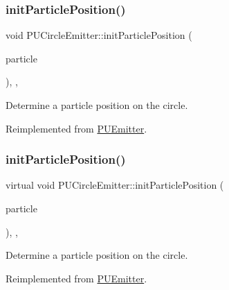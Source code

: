 \subsubsection{\texorpdfstring{init\+Particle\+Position()}{initParticlePosition()}\hspace{0.1cm}{\footnotesize\ttfamily [1/2]}}
{\footnotesize\ttfamily void P\+U\+Circle\+Emitter\+::init\+Particle\+Position (\begin{DoxyParamCaption}\item[{\hyperlink{structPUParticle3D}{P\+U\+Particle3D} $\ast$}]{particle }\end{DoxyParamCaption})\hspace{0.3cm}{\ttfamily [override]}, {\ttfamily [protected]}, {\ttfamily [virtual]}}

Determine a particle position on the circle. 

Reimplemented from \hyperlink{classPUEmitter_a2449f31b73c94a55f6559be71d56ca61}{P\+U\+Emitter}.

\mbox{\label{classPUCircleEmitter_a29bb94b8103ac04b51b65ca4780ce490}} 
\subsubsection{\texorpdfstring{init\+Particle\+Position()}{initParticlePosition()}\hspace{0.1cm}{\footnotesize\ttfamily [2/2]}}
{\footnotesize\ttfamily virtual void P\+U\+Circle\+Emitter\+::init\+Particle\+Position (\begin{DoxyParamCaption}\item[{\hyperlink{structPUParticle3D}{P\+U\+Particle3D} $\ast$}]{particle }\end{DoxyParamCaption})\hspace{0.3cm}{\ttfamily [override]}, {\ttfamily [protected]}, {\ttfamily [virtual]}}

Determine a particle position on the circle. 

Reimplemented from \hyperlink{classPUEmitter_a2449f31b73c94a55f6559be71d56ca61}{P\+U\+Emitter}.

\mbox{\label{classPUCircleEmitter_aa714297bc24104e9f8461565c89da555}} 
